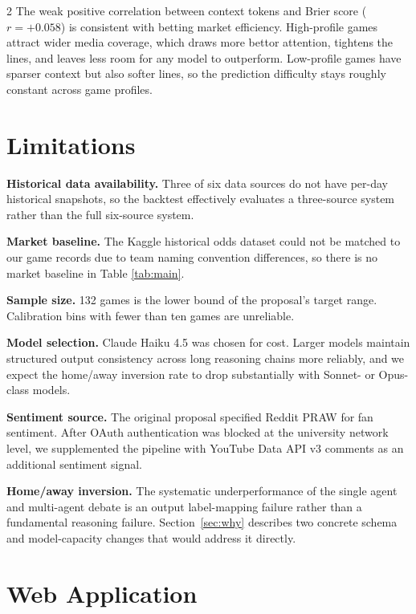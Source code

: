 \documentclass[11pt]{article}
\begin{document}
\begin{multicols}{2}
The weak positive correlation between context tokens and Brier score ($r = +0.058$) is consistent with betting market efficiency. High-profile games attract wider media coverage, which draws more bettor attention, tightens the lines, and leaves less room for any model to outperform. Low-profile games have sparser context but also softer lines, so the prediction difficulty stays roughly constant across game profiles.

\section{Limitations}
\label{sec:limitations}

\textbf{Historical data availability.} Three of six data sources do not have per-day historical snapshots, so the backtest effectively evaluates a three-source system rather than the full six-source system.

\textbf{Market baseline.} The Kaggle historical odds dataset could not be matched to our game records due to team naming convention differences, so there is no market baseline in Table \ref{tab:main}.

\textbf{Sample size.} 132 games is the lower bound of the proposal's target range. Calibration bins with fewer than ten games are unreliable.

\textbf{Model selection.} Claude Haiku 4.5 was chosen for cost. Larger models maintain structured output consistency across long reasoning chains more reliably, and we expect the home/away inversion rate to drop substantially with Sonnet- or Opus-class models.

\textbf{Sentiment source.} The original proposal specified Reddit PRAW for fan sentiment. After OAuth authentication was blocked at the university network level, we supplemented the pipeline with YouTube Data API v3 comments as an additional sentiment signal.

\textbf{Home/away inversion.} The systematic underperformance of the single agent and multi-agent debate is an output label-mapping failure rather than a fundamental reasoning failure. Section~\ref{sec:why} describes two concrete schema and model-capacity changes that would address it directly.

\section{Web Application}


\end{multicols}
\end{document}
